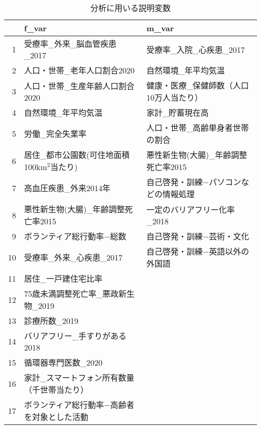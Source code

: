 \begin{table*}[ht]
\centering
\begingroup\tiny
\begin{tabular}{rll}
  \hline
 & f\_var & m\_var \\
  \hline
1 & 受療率\_外来\_脳血管疾患\_2017 & 受療率\_入院\_心疾患\_2017 \\
  2 & 人口・世帯\_老年人口割合2020 & 自然環境\_年平均気温 \\
  3 & 人口・世帯\_生産年齢人口割合2020 & 健康・医療\_保健師数（人口10万人当たり） \\
  4 & 自然環境\_年平均気温 & 家計\_貯蓄現在高 \\
  5 & 労働\_完全失業率 & 人口・世帯\_高齢単身者世帯の割合 \\
  6 & 居住\_都市公園数(可住地面積100km$^2$当たり) & 悪性新生物(大腸)\_年齢調整死亡率2015 \\
  7 & 高血圧疾患\_外来2014年 & 自己啓発・訓練−パソコンなどの情報処理 \\
  8 & 悪性新生物(大腸)\_年齢調整死亡率2015 & 一定のバリアフリー化率\_2018 \\
  9 & ボランティア総行動率−総数 & 自己啓発・訓練−芸術・文化 \\
  10 & 受療率\_外来\_心疾患\_2017 & 自己啓発・訓練−英語以外の外国語 \\
  11 & 居住\_一戸建住宅比率 &  \\
  12 & 75歳未満調整死亡率\_悪政新生物\_2019 &  \\
  13 & 診療所数\_2019 &  \\
  14 & バリアフリー\_手すりがある2018 &  \\
  15 & 循環器専門医数\_2020 &  \\
  16 & 家計\_スマートフォン所有数量（千世帯当たり） &  \\
  17 & ボランティア総行動率−高齢者を対象とした活動 &  \\
   \hline
\end{tabular}
\endgroup
\caption[bbb]{分析に用いる説明変数}
\label{UsedVariable}
\end{table*}
